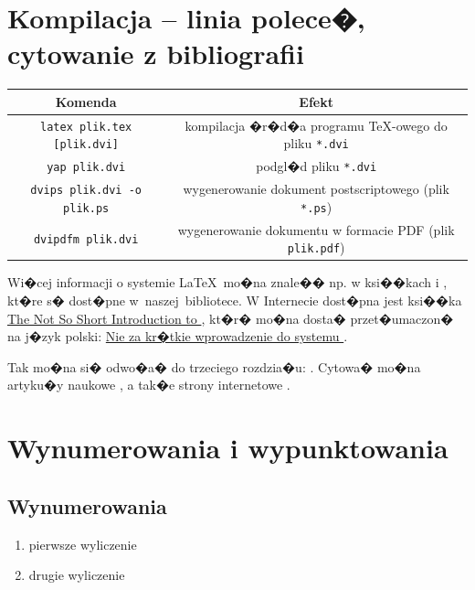 \documentclass[11pt,wide]{mwart}
\begin{document}
\section{Kompilacja -- linia polece�, cytowanie z bibliografii}

\begin{center}
	\small
	\begin{tabular}{|c|c|}
	Komenda & Efekt\\ \hline\hline\hline
	\verb"latex plik.tex [plik.dvi]" & kompilacja �r�d�a programu
	\TeX-owego do pliku \verb+*.dvi+\\
	\verb"yap plik.dvi" & podgl�d pliku \verb+*.dvi+\\ \hline
	\verb"dvips plik.dvi -o plik.ps" & wygenerowanie dokument
	postscriptowego (plik \verb+*.ps+)\\ \hline
	\verb"dvipdfm plik.dvi" & wygenerowanie dokumentu w formacie PDF (plik
	\verb+plik.pdf+)\\ \hline
	\end{tabular}
\end{center}
Wi�cej informacji o systemie \LaTeX~mo�na znale�� np. w ksi��kach \cite{JK} i
\cite{LL}, kt�re s� dost�pne w~naszej~bibliotece. W Internecie dost�pna jest
ksi��ka
\href{http://tobi.oetiker.ch/lshort/lshort.pdf}{The Not So
Short Introduction to \LaTeXe}, kt�r� mo�na dosta� przet�umaczon� na j�zyk
polski:
\href{ftp://sunsite.icm.edu.pl/pub/CTAN/info/lshort/polish/lshort2e.pdf}{Nie za
kr�tkie wprowadzenie do systemu \LaTeXe}.

\noindent Tak mo�na si� odwo�a� do trzeciego rozdzia�u: \cite[\S3]{JK}. Cytowa� mo�na artyku�y naukowe \cite{WL09}, a tak�e
strony internetowe \cite{II}.



\section{Wynumerowania i wypunktowania}

\subsection{Wynumerowania}

\begin{enumerate}
\itemsep 3pt%
\item pierwsze wyliczenie
\item drugie wyliczenie
\end{enumerate}
\end{document}
